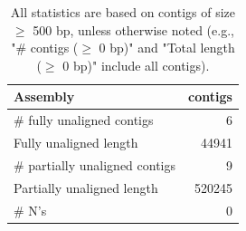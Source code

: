 \documentclass[12pt,a4paper]{article}
\begin{document}
\begin{table}[ht]
\begin{center}
\caption{All statistics are based on contigs of size $\geq$ 500 bp, unless otherwise noted (e.g., "\# contigs ($\geq$ 0 bp)" and "Total length ($\geq$ 0 bp)" include all contigs).}
\begin{tabular}{|l*{1}{|r}|}
\hline
Assembly & contigs \\ \hline
\# fully unaligned contigs & 6 \\ \hline
Fully unaligned length & 44941 \\ \hline
\# partially unaligned contigs & 9 \\ \hline
Partially unaligned length & 520245 \\ \hline
\# N's & 0 \\ \hline
\end{tabular}
\end{center}
\end{table}
\end{document}
